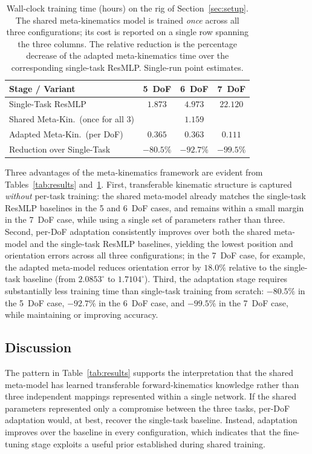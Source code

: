 \documentclass[conference]{IEEEtran}
\begin{document}
\begin{table}[!t]
\renewcommand{\arraystretch}{1.15}
\caption{Wall-clock training time (hours) on the rig of Section~\ref{sec:setup}. The shared meta-kinematics model is trained \emph{once} across all three configurations; its cost is reported on a single row spanning the three columns. The relative reduction is the percentage decrease of the adapted meta-kinematics time over the corresponding single-task ResMLP. Single-run point estimates.}
\label{tab:time}
\centering
\footnotesize
\begin{tabular}{lccc}
\toprule
Stage / Variant & 5~DoF & 6~DoF & 7~DoF \\
\midrule
Single-Task ResMLP & $1.873$ & $4.973$ & $22.120$ \\
Shared Meta-Kin.\ (once for all 3) & \multicolumn{3}{c}{$1.159$} \\
Adapted Meta-Kin.\ (per DoF) & $\mathbf{0.365}$ & $\mathbf{0.363}$ & $\mathbf{0.111}$ \\
\midrule
Reduction over Single-Task & $-80.5\%$ & $-92.7\%$ & $-99.5\%$ \\
\bottomrule
\end{tabular}
\end{table}

Three advantages of the meta-kinematics framework are evident from Tables~\ref{tab:results} and~\ref{tab:time}. First, transferable kinematic structure is captured \emph{without} per-task training: the shared meta-model already matches the single-task ResMLP baselines in the 5 and 6~DoF cases, and remains within a small margin in the 7~DoF case, while using a single set of parameters rather than three. Second, per-DoF adaptation consistently improves over both the shared meta-model and the single-task ResMLP baselines, yielding the lowest position and orientation errors across all three configurations; in the 7~DoF case, for example, the adapted meta-model reduces orientation error by $18.0\%$ relative to the single-task baseline (from $2.0853^\circ$ to $1.7104^\circ$). Third, the adaptation stage requires substantially less training time than single-task training from scratch: $-80.5\%$ in the 5~DoF case, $-92.7\%$ in the 6~DoF case, and $-99.5\%$ in the 7~DoF case, while maintaining or improving accuracy.

\subsection{Discussion}

The pattern in Table~\ref{tab:results} supports the interpretation that the shared meta-model has learned transferable forward-kinematics knowledge rather than three independent mappings represented within a single network. If the shared parameters represented only a compromise between the three tasks, per-DoF adaptation would, at best, recover the single-task baseline. Instead, adaptation improves over the baseline in every configuration, which indicates that the fine-tuning stage exploits a useful prior established during shared training.
\end{document}

